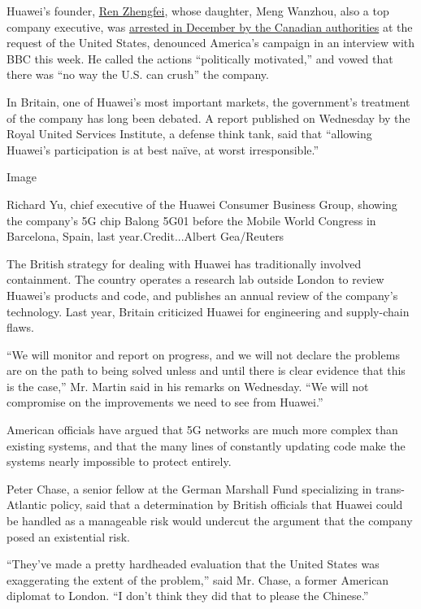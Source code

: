 Huawei's founder,
\href{https://www.nytimes.com/2019/02/18/technology/huawei-ren-zhengfei-bbc.html}{Ren
Zhengfei}, whose daughter, Meng Wanzhou, also a top company executive,
was
\href{https://www.nytimes.com/2018/12/05/business/huawei-cfo-arrest-canada-extradition.html?module=inline}{arrested
in December by the Canadian authorities} at the request of the United
States, denounced America's campaign in an interview with BBC this week.
He called the actions ``politically motivated,'' and vowed that there
was ``no way the U.S. can crush'' the company.

In Britain, one of Huawei's most important markets, the government's
treatment of the company has long been debated. A report published on
Wednesday by the Royal United Services Institute, a defense think tank,
said that ``allowing Huawei's participation is at best naïve, at worst
irresponsible.''

Image

Richard Yu, chief executive of the Huawei Consumer Business Group,
showing the company's 5G chip Balong 5G01 before the Mobile World
Congress in Barcelona, Spain, last year.Credit...Albert Gea/Reuters

The British strategy for dealing with Huawei has traditionally involved
containment. The country operates a research lab outside London to
review Huawei's products and code, and publishes an annual review of the
company's technology. Last year, Britain criticized Huawei for
engineering and supply-chain flaws.

``We will monitor and report on progress, and we will not declare the
problems are on the path to being solved unless and until there is clear
evidence that this is the case,'' Mr. Martin said in his remarks on
Wednesday. ``We will not compromise on the improvements we need to see
from Huawei.''

American officials have argued that 5G networks are much more complex
than existing systems, and that the many lines of constantly updating
code make the systems nearly impossible to protect entirely.

Peter Chase, a senior fellow at the German Marshall Fund specializing in
trans-Atlantic policy, said that a determination by British officials
that Huawei could be handled as a manageable risk would undercut the
argument that the company posed an existential risk.

``They've made a pretty hardheaded evaluation that the United States was
exaggerating the extent of the problem,'' said Mr. Chase, a former
American diplomat to London. ``I don't think they did that to please the
Chinese.''


